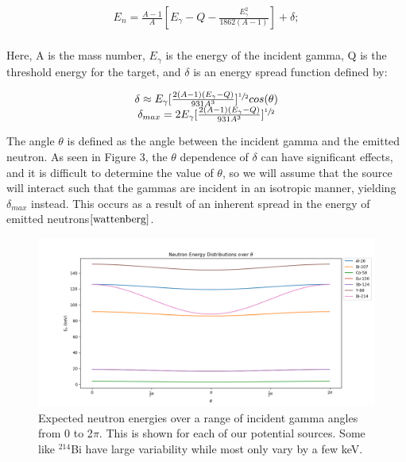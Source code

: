 \documentclass[%
12pt,
twoside,
reprint,
amsmath,amssymb,
aps,
]{article}
\begin{document}
	\begin{equation}
	\begin{array}{c}
	E_{n} = \frac{A - 1}{A} [E_{\gamma} - Q - \frac{E_{\gamma}^{2}}{1862 (A - 1)}] + \delta; \\
	\end{array}
	\end{equation}
	
	\noindent Here, A is the mass number, $E_{\gamma}$ is the energy of the incident gamma, Q is the threshold energy for the target, and $\delta$ is an energy spread function defined by:
	
	\begin{equation}
	\begin{array}{c}
	\delta \approx E_{\gamma}[\frac{2(A-1)(E_{\gamma}-Q)}{931A^{3}}]^{\sfrac{1}{2}} cos(\theta) \\
	\delta_{max} = 2E_{\gamma}[\frac{2(A-1)(E_{\gamma}-Q)}{931A^{3}}]^{\sfrac{1}{2}}
	\end{array}
	\end{equation}
	
	\noindent The angle $\theta$ is defined as the angle between the incident gamma and the emitted neutron. As seen in Figure 3, the $\theta$ dependence of $\delta$ can have significant effects, and it is difficult to determine the value of $\theta$, so we will assume that the source will interact such that the gammas are incident in an isotropic manner, yielding $\delta_{max}$ instead. This occurs as a result of an inherent spread in the energy of emitted neutrons${\cite{wattenberg}}$.
	
	\begin{figure}
		\includegraphics[scale = 0.7, center]{Images/neutron_energy_distribution.png}
		\caption{\label{tab:table-name} Expected neutron energies over a range of incident gamma angles from 0 to 2$\pi$. This is shown for each of our potential sources. Some like $^{214}$Bi have large variability while most only vary by a few keV.}
	\end{figure}
	
\end{document}

